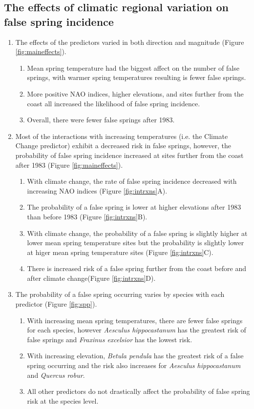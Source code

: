 \documentclass{article}\usepackage[]{graphicx}\usepackage[]{color}
\begin{document}
\subsection*{The effects of climatic regional variation on false spring incidence}
\begin{enumerate}
\item The effects of the predictors varied in both direction and magnitude (Figure \ref{fig:maineffects}).
  \begin{enumerate}
  \item Mean spring temperature had the biggest affect on the number of false springs, with warmer spring temperatures resulting is fewer false springs. 
  \item More positive NAO indices, higher elevations, and sites further from the coast all increased the likelihood of false spring incidence. 
  \item Overall, there were fewer false springs after 1983. 
  \end{enumerate}
\item Most of the interactions with increasing temperatures (i.e. the Climate Change predictor) exhibit a decreased risk in false springs, however, the probability of false spring incidence increased at sites further from the coast after 1983 (Figure \ref{fig:maineffects}). 
  \begin{enumerate}
  \item With climate change, the rate of false spring incidence decreased with increasing NAO indices (Figure \ref{fig:intrxns}A).
  \item The probability of a false spring is lower at higher elevations after 1983 than before 1983 (Figure \ref{fig:intrxns}B).
  \item With climate change, the probability of a false spring is slightly higher at lower mean spring temperature sites but the probability is slightly lower at higer mean spring temperature sites (Figure \ref{fig:intrxns}C).
  \item There is increased risk of a false spring further from the coast before and after climate change(Figure \ref{fig:intrxns}D).
  \end{enumerate}
\item The probability of a false spring occurring varies by species with each predictor (Figure \ref{fig:spp}).
  \begin{enumerate}
  \item With increasing mean spring temperatures, there are fewer false springs for each species, however \textit{Aesculus hippocastanum} has the greatest risk of false springs and \textit{Fraxinus excelsior} has the lowest risk. 
  \item With increasing elevation, \textit{Betula pendula} has the greatest risk of a false spring occurring and the risk also increases for \textit{Aesculus hippocastanum} and \textit{Quercus robur}. 
  \item All other predictors do not drastically affect the probability of false spring risk at the species level.
\end{enumerate}
\end{enumerate}
\end{document}
